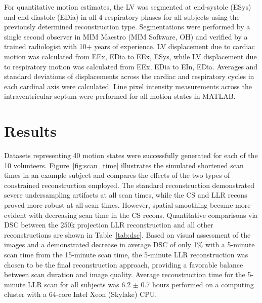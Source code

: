 For quantitative motion estimates, the LV was segmented at end-systole (ESys) and end-diastole (EDia) in all 4 respiratory phases for all subjects using the previously determined reconstruction type. Segmentations were performed by a single second observer in MIM Maestro (MIM Software, OH) and verified by a trained radiologist with 10+ years of experience. LV displacement due to cardiac motion was calculated from EEx, EDia to EEx, ESys, while LV displacement due to respiratory motion was calculated from EEx, EDia to EIn, EDia. Averages and standard deviations of displacements across the cardiac and respiratory cycles in each cardinal axis were calculated. Line pixel intensity measurements across the intraventricular septum were performed for all motion states in MATLAB\@.

\section{Results}
Datasets representing 40 motion states were successfully generated for each of the 10 volunteers. Figure~\ref{fig:scan_time} illustrates the simulated shortened scan times in an example subject and compares the effects of the two types of constrained reconstruction employed. The standard reconstruction demonstrated severe undersampling artifacts at all scan times, while the CS and LLR recons proved more robust at all scan times. However, spatial smoothing became more evident with decreasing scan time in the CS recons. Quantitative comparisons via DSC between the 250k projection LLR reconstruction and all other reconstructions are shown in Table~\ref{tab:dsc}. Based on visual assessment of the images and a demonstrated decrease in average DSC of only 1\% with a 5-minute scan time from the 15-minute scan time, the 5-minute LLR reconstruction was chosen to be the final reconstruction approach, providing a favorable balance between scan duration and image quality. Average reconstruction time for the 5-minute LLR scan for all subjects was 6.2 $\pm$ 0.7 hours performed on a computing cluster with a 64-core Intel Xeon (Skylake) CPU\@.

